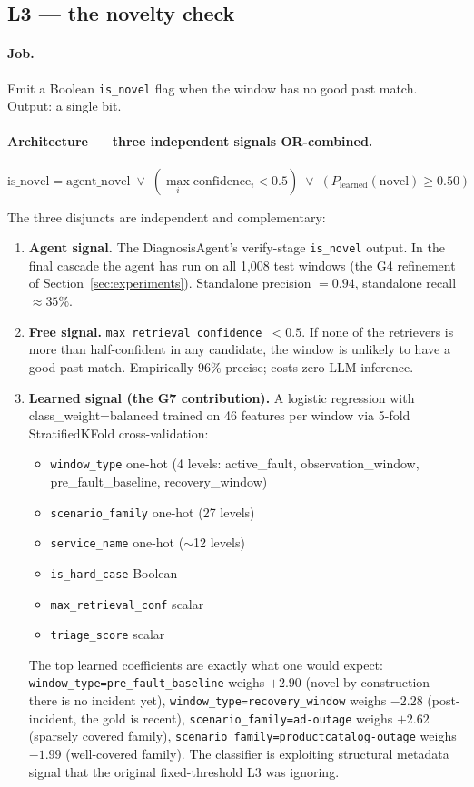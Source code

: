 \subsection{L3 --- the novelty check}

\paragraph{Job.} Emit a Boolean \texttt{is\_novel} flag when the window has no good past match. Output: a single bit.

\paragraph{Architecture --- three independent signals OR-combined.}

\[
\text{is\_novel} = \text{agent\_novel} \;\lor\; (\max_{i} \text{confidence}_i < 0.5) \;\lor\; (P_{\text{learned}}(\text{novel}) \geq 0.50)
\]

The three disjuncts are independent and complementary:

\begin{enumerate}
\item \textbf{Agent signal.} The DiagnosisAgent's verify-stage \texttt{is\_novel} output. In the final cascade the agent has run on all 1{,}008 test windows (the G4 refinement of Section~\ref{sec:experiments}). Standalone precision $= 0.94$, standalone recall $\approx 35\%$.
\item \textbf{Free signal.} \texttt{max retrieval confidence $< 0.5$}. If none of the retrievers is more than half-confident in any candidate, the window is unlikely to have a good past match. Empirically 96\% precise; costs zero LLM inference.
\item \textbf{Learned signal (the G7 contribution).} A logistic regression with class\_weight=balanced trained on 46 features per window via 5-fold StratifiedKFold cross-validation:
\begin{itemize}
\item \texttt{window\_type} one-hot (4 levels: active\_fault, observation\_window, pre\_fault\_baseline, recovery\_window)
\item \texttt{scenario\_family} one-hot (27 levels)
\item \texttt{service\_name} one-hot ($\sim$12 levels)
\item \texttt{is\_hard\_case} Boolean
\item \texttt{max\_retrieval\_conf} scalar
\item \texttt{triage\_score} scalar
\end{itemize}
The top learned coefficients are exactly what one would expect: \texttt{window\_type=pre\_fault\_baseline} weighs $+2.90$ (novel by construction --- there is no incident yet), \texttt{window\_type=recovery\_window} weighs $-2.28$ (post-incident, the gold is recent), \texttt{scenario\_family=ad-outage} weighs $+2.62$ (sparsely covered family), \texttt{scenario\_family=productcatalog-outage} weighs $-1.99$ (well-covered family). The classifier is exploiting structural metadata signal that the original fixed-threshold L3 was ignoring.
\end{enumerate}

